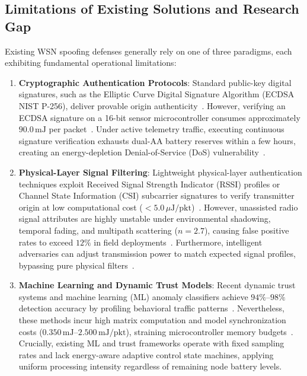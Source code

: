 \documentclass[conference]{IEEEtran}
\begin{document}
\subsection{Limitations of Existing Solutions and Research Gap}
Existing WSN spoofing defenses generally rely on one of three paradigms, each exhibiting fundamental operational limitations:
\begin{enumerate}
    \item \textbf{Cryptographic Authentication Protocols}: Standard public-key digital signatures, such as the Elliptic Curve Digital Signature Algorithm (ECDSA NIST P-256), deliver provable origin authenticity~\cite{ref_ecc_wsn_10, ref_tinyecc_24}. However, verifying an ECDSA signature on a 16-bit sensor microcontroller consumes approximately $90.0\,\text{mJ}$ per packet~\cite{ref_crypto_cost_11, ref_ecdsa_bench_13}. Under active telemetry traffic, executing continuous signature verification exhausts dual-AA battery reserves within a few hours, creating an energy-depletion Denial-of-Service (DoS) vulnerability~\cite{ref_ch_depletion_15}.
    \item \textbf{Physical-Layer Signal Filtering}: Lightweight physical-layer authentication techniques exploit Received Signal Strength Indicator (RSSI) profiles or Channel State Information (CSI) subcarrier signatures to verify transmitter origin at low computational cost ($<5.0\,\mu\text{J}/\text{pkt}$)~\cite{ref_yang_rssi_20, ref_liu_csi_21}. However, unassisted radio signal attributes are highly unstable under environmental shadowing, temporal fading, and multipath scattering ($n=2.7$), causing false positive rates to exceed $12\%$ in field deployments~\cite{ref_rssi_fading_16, ref_interference_wsn_29}. Furthermore, intelligent adversaries can adjust transmission power to match expected signal profiles, bypassing pure physical filters~\cite{ref_adv_ml_35}.
    \item \textbf{Machine Learning and Dynamic Trust Models}: Recent dynamic trust systems and machine learning (ML) anomaly classifiers achieve $94\%$--$98\%$ detection accuracy by profiling behavioral traffic patterns~\cite{ref_tmc_trust_2024, ref_jsen_svm_2022, ref_iotj_fedtrust_2024}. Nevertheless, these methods incur high matrix computation and model synchronization costs ($0.350\,\text{mJ}$--$2.500\,\text{mJ}/\text{pkt}$), straining microcontroller memory budgets~\cite{ref_wiley_ids_2024}. Crucially, existing ML and trust frameworks operate with fixed sampling rates and lack energy-aware adaptive control state machines, applying uniform processing intensity regardless of remaining node battery levels.
\end{enumerate}
\end{document}
